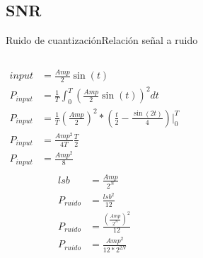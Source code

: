  \subsection{SNR}
 \begin{frame}{Ruido de cuantización}{Relación señal a ruido}
    \begin{columns}[onlytextwidth]
       \begin{align*}
          input&=\frac{Amp}{2}\sin(t) \\
          P_{input} &= \frac{1}{T} \int^T_0 \left(\frac{Amp}{2}\sin(t)\right)^2 dt \\
          P_{input} &= \frac{1}{T} \left(\frac{Amp}{2}\right)^2* \left( \frac{t}{2}-\frac{\sin(2t)}{4}\right)\Big\rvert^T_0 \\
          P_{input} &= \frac{Amp^2}{4T} \frac{T}{2}\\
          P_{input} &= \frac{Amp^2}{8} \\
       \end{align*}
       \begin{align*}
          lsb       &= \frac{Amp}{2^N} \\
          P_{ruido} &= \frac{lsb^2}{12}\\
          P_{ruido} &= \frac{\left(\frac{Amp}{2^N}\right)^2}{12}\\
          P_{ruido} &= \frac{Amp^2}{12*2^{2N}}\\
       \end{align*}
    \end{columns}
    \vfill
 \end{frame}
